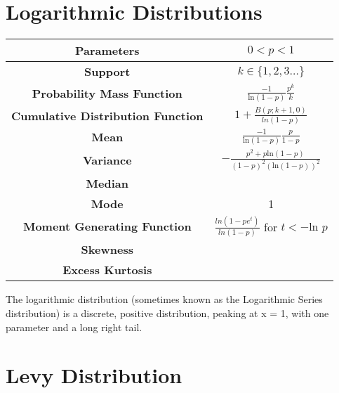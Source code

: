\documentclass[14pt, a4paper]{article}
\theoremstyle{definition}
\begin{document}
\section{Logarithmic Distributions}


\begin{tabular}{|c|c|}  %
\hline
 \textbf{Parameters }&  $ 0 < p < 1$\\
 \hline
 \textbf{Support} & $k \in \{ 1, 2, 3 \dots \}$ \\
 \hline
 \textbf{Probability Mass Function} &  $\frac{-1}{\text{ln}(1-p)} \frac{p^k}{k}$ \\
 \hline
 \textbf{Cumulative Distribution Function} & $ 1 + \frac{B(p ;k+1,0)}{ln(1-p)}$ \\
 \hline
 \textbf{Mean} & $\frac{-1}{\text{ln}(1-p)} \frac{p}{1-p}$ \\ 
 \hline
 \textbf{Variance} & $- \frac{p^2 + p \text{ln}(1-p)}{(1-p)^2 (\text{ln}(1-p))^2}$ \\
 \hline
 \textbf{Median} &  \\ 
 \hline
 \textbf{Mode} & 1 \\
 \hline
 \textbf{Moment Generating Function} & $\frac{ln(1 - pe^t)}{ln (1-p)}$ for $t < - \text{ln } p $\\
 \hline
 \textbf{Skewness} & \\
 \hline
 \textbf{Excess Kurtosis} &   \\
 \hline
 
       
  \end{tabular}
  
The logarithmic distribution (sometimes known as the Logarithmic Series distribution) is a discrete, positive distribution, peaking at x = 1, with one parameter and a long right tail. 
  
  
\section{Levy Distribution}
\end{document}
